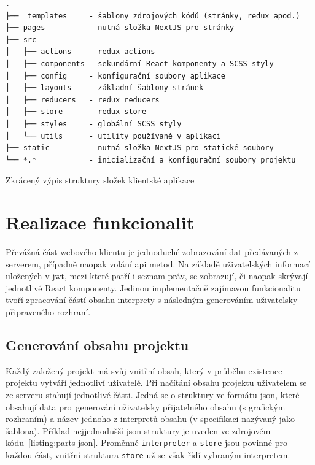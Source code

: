 \begin{fig:code}
	\begin{verbatim}
.
├── _templates     - šablony zdrojových kódů (stránky, redux apod.)
├── pages          - nutná složka NextJS pro stránky
├── src
│   ├── actions    - redux actions
│   ├── components - sekundární React komponenty a SCSS styly
│   ├── config     - konfigurační soubory aplikace
│   ├── layouts    - základní šablony stránek
│   ├── reducers   - redux reducers
│   ├── store      - redux store
│   ├── styles     - globální SCSS styly
│   └── utils      - utility používané v aplikaci
├── static         - nutná složka NextJS pro statické soubory
└── *.*            - inicializační a konfigurační soubory projektu
   \end{verbatim}
   \caption{Zkrácený výpis struktury složek klientské aplikace}\label{folders:client}
\end{fig:code}

   



\section{Realizace funkcionalit}

Převážná část webového klientu je jednoduché zobrazování dat předávaných z serverem, případně naopak volání \gls{api} metod. Na základě uživatelských informací uložených v \gls{jwt}, mezi které patří i seznam práv, se zobrazují, či naopak skrývají jednotlivé React komponenty. Jedinou implementačně zajímavou funkcionalitu tvoří zpracování částí obsahu interprety s následným generováním uživatelsky připraveného rozhraní.


\subsection{Generování obsahu projektu}
Každý založený projekt má svůj vnitřní obsah, který v průběhu existence projektu vytváří jednotliví uživatelé. Při načítání obsahu projektu uživatelem se ze serveru stahují jednotlivé části. Jedná se o struktury ve formátu \gls{json}, které obsahují data pro~generování uživatelsky přijatelného obsahu (s grafickým rozhraním) a název jednoho z interpretů obsahu (v specifikaci nazývaný jako šablona). Příklad nejjednodušší \gls{json} struktury je uveden ve zdrojovém kódu~\ref{listing:parts-json}. Proměnné \texttt{interpreter} a \texttt{store} jsou povinné pro každou část, vnitřní struktura \texttt{store} už se však řídí vybraným interpretem. 

